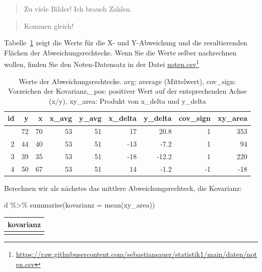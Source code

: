 \documentclass[
  letterpaper,
]{scrbook}
\newenvironment{Shaded}{\begin{snugshade}}{\end{snugshade}}
\newcommand{\AttributeTok}[1]{\textcolor[rgb]{0.40,0.45,0.13}{#1}}
\newcommand{\FunctionTok}[1]{\textcolor[rgb]{0.28,0.35,0.67}{#1}}
\newcommand{\NormalTok}[1]{\textcolor[rgb]{0.00,0.23,0.31}{#1}}
\newcommand{\SpecialCharTok}[1]{\textcolor[rgb]{0.37,0.37,0.37}{#1}}
\theoremstyle{definition}
\theoremstyle{definition}
\theoremstyle{definition}
\theoremstyle{remark}
\begin{document}
\begin{quote}
{} Zu viele Bilder! Ich brauch Zahlen.
\end{quote}

\begin{quote}
{} Kommen gleich!
\end{quote}

Tabelle~\ref{tbl-kov2} zeigt die Werte für die X- und Y-Abweichung und
die resultierenden Flächen der Abweichungsrechtecke. Wenn Sie die Werte
selber nachrechnen wollen, finden Sie den Noten-Datensatz in der Datei
\href{https://raw.githubusercontent.com/sebastiansauer/statistik1/main/daten/noten.csv}{noten.csv}\footnote{\url{https://raw.githubusercontent.com/sebastiansauer/statistik1/main/daten/noten.csv}}

\begin{longtable}[]{@{}rrrrrrrrr@{}}

\caption{\label{tbl-kov2}Werte der Abweichungsrechtecke. avg: average
(Mittelwert), cov\_sign: Vorzeichen der Kovarianz,\_pos: positiver Wert
auf der entsprechenden Achse (x/y), xy\_area: Produkt von x\_delta und
y\_delta}

\tabularnewline

\toprule\noalign{}
id & y & x & x\_avg & y\_avg & x\_delta & y\_delta & cov\_sign &
xy\_area \\
\midrule\noalign{}
\endhead
\bottomrule\noalign{}
\endlastfoot
1 & 72 & 70 & 53 & 51 & 17 & 20.8 & 1 & 353 \\
2 & 44 & 40 & 53 & 51 & -13 & -7.2 & 1 & 94 \\
3 & 39 & 35 & 53 & 51 & -18 & -12.2 & 1 & 220 \\
4 & 50 & 67 & 53 & 51 & 14 & -1.2 & -1 & -18 \\

\end{longtable}

Berechnen wir als nächstes das mittlere Abweichungsrechteck, die
Kovarianz:

\begin{Shaded}
\begin{Highlighting}[]
\NormalTok{d }\SpecialCharTok{\%\textgreater{}\%}
  \FunctionTok{summarise}\NormalTok{(}\AttributeTok{kovarianz =} \FunctionTok{mean}\NormalTok{(xy\_area))}
\end{Highlighting}
\end{Shaded}

\begin{longtable}[]{@{}r@{}}
\toprule\noalign{}
kovarianz \\
\midrule\noalign{}
\endhead
\bottomrule\noalign{}
\endlastfoot
162 \\
\end{longtable}
\end{document}
